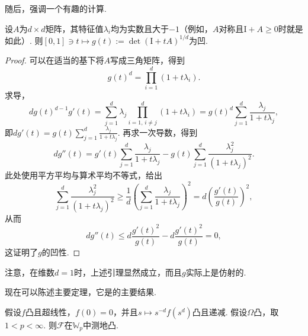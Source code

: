 随后，强调一个有趣的计算.
\begin{lemma}\label{obj:7.26}
设$A$为$d\times d$矩阵，其特征值$\lambda_i$均为实数且大于$-1$（例如，$A$对称且$\mathrm I+A\geq0$时就是如此）. 则$[0,1]\ni t\mapsto g(t):=\det(\mathrm I+tA)^{1/d}$为凹.
\end{lemma}
\begin{proof}
可以在适当的基下将$A$写成三角矩阵，得到
\[
 g(t)^d=\prod_{i=1}^d(1+t\lambda_i).
\]
求导，
\[
 dg(t)^{d-1}g'(t)=\sum_{j=1}^d\lambda_j
           \prod_{i=1,\,i\ne j}^d(1+t\lambda_i)
         =g(t)^d\sum_{j=1}^d\frac{\lambda_j}{1+t\lambda_j},
\]
即$dg'(t)=g(t)\sum_{j=1}^d\frac{\lambda_j}{1+t\lambda_j}$. 再求一次导数，得到
\[
 dg''(t)=g'(t)\sum_{j=1}^d\frac{\lambda_j}{1+t\lambda_j}
       -g(t)\sum_{j=1}^d\frac{\lambda_j^2}{(1+t\lambda_j)^2}.
\]
此处使用平方平均与算术平均不等式，给出
\[
 \sum_{j=1}^d\frac{\lambda_j^2}{(1+t\lambda_j)^2}
 \geq\frac1d\left(\sum_{j=1}^d\frac{\lambda_j}{1+t\lambda_j}\right)^2
 =d\left(\frac{g'(t)}{g(t)}\right)^2,
\]
从而
\[
 dg''(t)\leq d\frac{g'(t)^2}{g(t)}-d\frac{g'(t)^2}{g(t)}=0,
\]
这证明了$g$的凹性.
\end{proof}
\begin{remark}\label{obj:7.27}
注意，在维数$d=1$时，上述引理显然成立，而且$g$实际上是仿射的.
\end{remark}
现在可以陈述主要定理，它是\cite{b229}的主要结果.
\begin{theorem}\label{obj:7.28}
假设$f$凸且超线性，$f(0)=0$，并且$s\mapsto s^{-d}f(s^d)$凸且递减. 假设$\Omega$凸，取$1<p<\infty$. 则$\mathscr F$在$\mathbb W_p$中测地凸.
\end{theorem}

